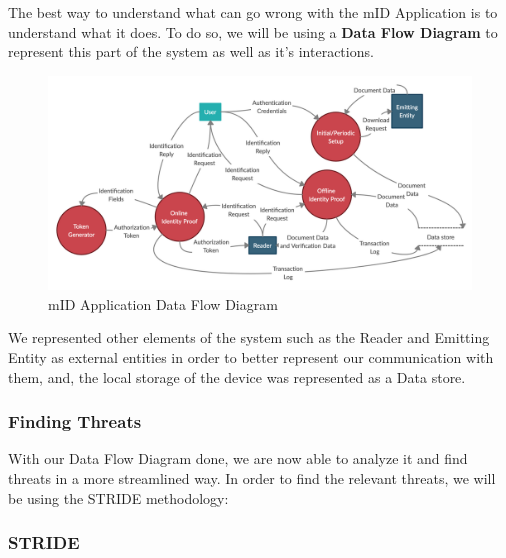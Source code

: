 The best way to understand what can go wrong with the mID Application is to understand what it does. To do so, we will be using a \textbf{Data Flow Diagram} to represent this part of the system as well as it's interactions.


\begin{figure}[ht!]
 	\centering
 	\includegraphics[width=0.94\linewidth]{img/mIDApplicationDFD.png}
 	\caption{mID Application Data Flow Diagram}
 \end{figure}
 
 We represented other elements of the system such as the Reader and Emitting Entity as external entities in order to better represent our communication with them, and, the local storage of the device was represented as a Data store.

\subsubsection{Finding Threats}

With our Data Flow Diagram done, we are now able to analyze it and find threats in a more streamlined way. In order to find the relevant threats, we will be using the STRIDE methodology:

\subsubsection{STRIDE}

